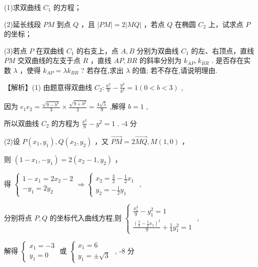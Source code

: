\documentclass[10pt]{article}
\begin{document}
(1)求双曲线 \({C}_{1}\) 的方程；

(2)延长线段 \({PM}\) 到点 \(Q\) ，且 \(\left| {PM}\right|  = 2\left| {MQ}\right|\) ，若点 \(Q\) 在椭圆 \({C}_{2}\) 上，试求点 \(P\) 的坐标；

(3)若点 \(P\) 在双曲线 \({C}_{1}\) 的右支上，点 \(A,B\) 分别为双曲线 \({C}_{1}\) 的左、右顶点，直线 \({PM}\) 交双曲线的左支于点 \(R\) ，直线 \({AP},{BR}\) 的斜率分别为 \({k}_{AP},{k}_{BR}\) . 是否存在实数 \(\lambda\) ，使得 \({k}_{AP} = \lambda {k}_{BR}\) ? 若存在,求出 \(\lambda\) 的值; 若不存在,请说明理由.

【解析】(1) 由题意得双曲线 \({C}_{2} : \frac{{x}^{2}}{9} - \frac{{y}^{2}}{{b}^{2}} = 1\left( {0 < b < 3}\right)\) ,

因为 \({e}_{1}{e}_{2} = \frac{\sqrt{9 - {b}^{2}}}{3} \times  \frac{\sqrt{9 + {b}^{2}}}{3} = \frac{4\sqrt{5}}{9}\) ,解得 \(b = 1\) ,

所以双曲线 \({C}_{2}\) 的方程为 \(\frac{{x}^{2}}{9} - {y}^{2} = 1\) . -4 分

(2)设 \(P\left( {{x}_{1},{y}_{1}}\right) ,Q\left( {{x}_{2},{y}_{2}}\right)\) ，又 \(\overrightarrow{PM} = 2\overrightarrow{MQ},M\left( {1,0}\right)\) ，

则 \(\left( {1 - {x}_{1}, - {y}_{1}}\right)  = 2\left( {{x}_{2} - 1,{y}_{2}}\right)\) ，

得 \(\left\{  {\begin{array}{l} 1 - {x}_{1} = 2{x}_{2} - 2 \\   - {y}_{1} = 2{y}_{2} \end{array} \Rightarrow  \left\{  \begin{array}{l} {x}_{2} = \frac{3}{2} - \frac{1}{2}{x}_{1} \\  {y}_{2} =  - \frac{1}{2}{y}_{1} \end{array}\right. }\right.\) ,

分别将点 \(P,Q\) 的坐标代入曲线方程,则 \(\left\{  \begin{array}{l} \frac{{x}_{1}^{2}}{9} - {y}_{1}^{2} = 1 \\  \frac{{\left( \frac{3}{2} - \frac{1}{2}{x}_{1}\right) }^{2}}{9} + \frac{1}{4}{y}_{1}^{2} = 1 \end{array}\right.\) ,

解得 \(\left\{  \begin{array}{l} {x}_{1} =  - 3 \\  {y}_{1} = 0 \end{array}\right.\) 或 \(\left\{  \begin{array}{l} {x}_{1} = 6 \\  {y}_{1} =  \pm  \sqrt{3} \end{array}\right.\) , -8 分
\end{document}
